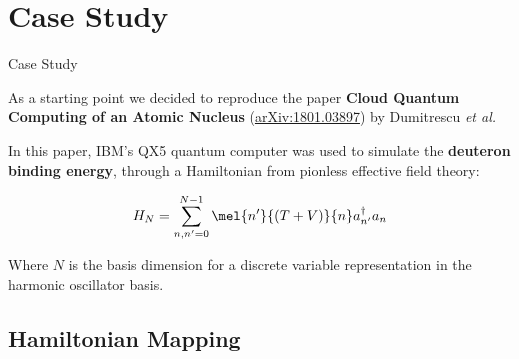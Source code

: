 \documentclass[9pt, handout, aspectratio=169]{beamer}		%
\begin{document}

\section{Case Study}

	\begin{frame}{Case Study}

		As a starting point we decided to reproduce the paper \textbf{Cloud Quantum Computing of an Atomic Nucleus} (\href{https://arxiv.org/abs/1801.03897}{arXiv:1801.03897}) by Dumitrescu \textit{et al.}

		\medskip

		In this paper, IBM's QX5 quantum computer was used to simulate the \textbf{deuteron binding energy}, through a Hamiltonian from pionless effective field theory:

		\begin{align*}
			H_N = \sum^{N-1}_{n,n'=0} \mel{n'}{(T+V)}{n}a^{\dagger}_{n'}a_{n}
		\end{align*}

		Where $N$ is the basis dimension for a discrete variable representation in the harmonic oscillator basis.

	\end{frame}


	\subsection{Hamiltonian Mapping}
\end{document}
